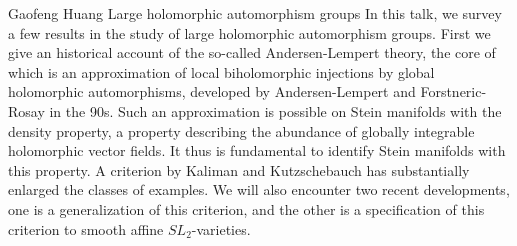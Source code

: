 \talk
{%
    Gaofeng Huang
}
{%
    Large holomorphic automorphism groups
}
{%
    In this talk, we survey a few results in the study of large
    holomorphic automorphism groups. First we give an historical
    account of the so-called Andersen-Lempert theory, the core of
    which is an approximation of local biholomorphic injections by
    global holomorphic automorphisms, developed by Andersen-Lempert
    and Forstneric-Rosay in the 90s. Such an approximation is
    possible on Stein manifolds with the density property, a
    property describing the abundance of globally integrable
    holomorphic vector fields.  It thus is fundamental to identify
    Stein manifolds with this property. A criterion by Kaliman and
    Kutzschebauch has substantially enlarged the classes of
    examples. We will also encounter two recent developments, one is
    a generalization of this criterion, and the other is a
    specification of this criterion to smooth affine $SL_2$-varieties.
}
